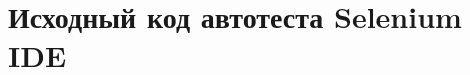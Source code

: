\section{Исходный код автотеста Selenium IDE}
\label{lst:selenium_code}

\begin{codemultipage}
    \nopagebreak
    \inputminted{json}{scripts/DE_pop.side}
\end{codemultipage}